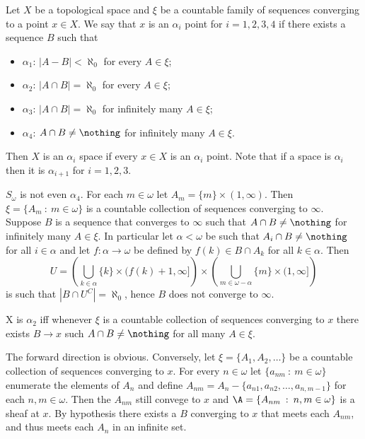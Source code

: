 \documentclass{article}
\begin{document}
\begin{defn}
    Let \(X\) be a topological space and \(\xi\) be a countable family of sequences converging to a point \(x \in X\). We say that \(x\) is an \(\alpha_i\) point for \(i = 1, 2, 3, 4\) if there exists a sequence \(B\) such that 
    \begin{itemize}
        \item \(\alpha_1\):  \(|A - B| < \aleph_0\) for every \(A \in \xi\);
        \item \(\alpha_2\): \(|A \cap B| = \aleph_0\) for every \(A \in \xi\);
        \item \(\alpha_3\): \(|A \cap B| = \aleph_0\) for infinitely many \(A \in \xi\);
        \item \(\alpha_4\): \(A \cap B \neq \nothing\) for infinitely many \(A \in \xi\).
    \end{itemize}
    Then \(X\) is an \(\alpha_i\) space if every \(x \in X\) is an \(\alpha_i\) point. Note that if a space is \(\alpha_i\) then it is \(\alpha_{i + 1}\) for \(i =1, 2, 3\).
\end{defn}

\begin{exam}
    \(S_{\omega}\) is not even \(\alpha_4\). For each \(m \in \omega\) let \(A_m = \{m\} \times (1, \infty)\). Then \(\xi = \{A_m \: : \: m \in \omega\}\) is a countable collection of sequences converging to \(\infty\). Suppose \(B\) is a sequence that converges to \(\infty\) such that \(A\cap B \neq \nothing\) for infinitely many \(A \in \xi\). In particular let \(\alpha < \omega\) be such that \(A_i \cap B \neq \nothing\) for all \(i \in \alpha\) and let \(f:\alpha \to \omega\) be defined by \(f(k) \in B \cap A_k\) for all \(k \in \alpha\). Then 
    \[
    U = \left(\bigcup_{k \in \alpha} \{k\} \times (f(k) + 1, \infty]\right)\times \left(\bigcup_{m \in \omega-\alpha} \{m\} \times (1, \infty]\right)\] 
    is such that \(|B \cap U^C| = \aleph_0\), hence \(B\) does not converge to \(\infty\). 

\end{exam}

\begin{exercise}{\label{var_alpha2}}
    X is \(\alpha_2\) iff whenever \(\xi\) is a countable collection of sequences converging to \(x\) there exists \(B \to x\) such \(A \cap B \neq \nothing\) for all many \(A \in \xi\).
\end{exercise}
\begin{soln}
    The forward direction is obvious. Conversely, let \(\xi =\{A_1, A_2, \dots\}\) be a countable collection of sequences converging to \(x\). For every \(n\in \omega\) let \(\{a_{nm} \: : \: m \in \omega\}\) enumerate the elements of \(A_n\) and define \(A_{nm} = A_n - \{a_{n1}, a_{n2}, \dots, a_{n,m-1}\}\) for each \(n,m \in \omega\). Then the \(A_{nm}\) still convege to \(x\) and  \(\A = \{A_{nm} \: : \: n,m \in \omega \}\) is a sheaf at \(x\). By hypothesis there exists a \(B\) converging to \(x\) that meets each \(A_{nm}\), and thus meets each \(A_n\) in an infinite set.
\end{soln}
\end{document}

